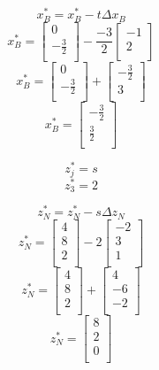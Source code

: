 \documentclass[14pt]{extarticle}
\begin{document}
\[
    x^*_B = x^*_B - t \Delta x_B
\]
\[
    x^*_B = \begin{bmatrix}
        0 \\
        -\frac{3}{2} \\
    \end{bmatrix}
    - \frac{-3}{2} \begin{bmatrix}
        -1 \\
        2 \\
    \end{bmatrix}
\]
\[
    x^*_B = \begin{bmatrix}
        0 \\
        -\frac{3}{2} \\
    \end{bmatrix}
    + \begin{bmatrix}
        -\frac{3}{2} \\
        3 \\
    \end{bmatrix}
\]
\[
    x^*_B = \begin{bmatrix}
        -\frac{3}{2} \\
        \frac{3}{2} \\
    \end{bmatrix}
\]

\[
    z^*_j = s
\]
\[
    z^*_3 = 2
\]

\[
    z^*_N = z^*_N - s \Delta z_N
\]
\[
    z^*_N = \begin{bmatrix}
        4 \\
        8 \\
        2 \\
    \end{bmatrix}
    - 2 \begin{bmatrix}
        -2 \\
        3 \\
        1 \\
    \end{bmatrix}
\]
\[
    z^*_N = \begin{bmatrix}
        4 \\
        8 \\
        2 \\
    \end{bmatrix}
    + \begin{bmatrix}
        4 \\
        -6 \\
        -2 \\
    \end{bmatrix}
\]
\[
    z^*_N = \begin{bmatrix}
        8 \\
        2 \\
        0 \\
    \end{bmatrix}
\]
\end{document}
